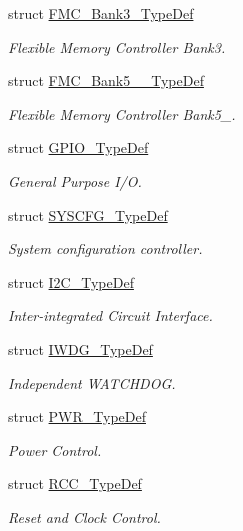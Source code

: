 \begin{DoxyCompactItemize}
struct \mbox{\hyperlink{struct_f_m_c___bank3___type_def}{F\+M\+C\+\_\+\+Bank3\+\_\+\+Type\+Def}}
\begin{DoxyCompactList}\small\item\em Flexible Memory Controller Bank3. \end{DoxyCompactList}\item 
struct \mbox{\hyperlink{struct_f_m_c___bank5__6___type_def}{F\+M\+C\+\_\+\+Bank5\+\_\+\_\+\+Type\+Def}}
\begin{DoxyCompactList}\small\item\em Flexible Memory Controller Bank5\+\_. \end{DoxyCompactList}\item 
struct \mbox{\hyperlink{struct_g_p_i_o___type_def}{G\+P\+I\+O\+\_\+\+Type\+Def}}
\begin{DoxyCompactList}\small\item\em General Purpose I/O. \end{DoxyCompactList}\item 
struct \mbox{\hyperlink{struct_s_y_s_c_f_g___type_def}{S\+Y\+S\+C\+F\+G\+\_\+\+Type\+Def}}
\begin{DoxyCompactList}\small\item\em System configuration controller. \end{DoxyCompactList}\item 
struct \mbox{\hyperlink{struct_i2_c___type_def}{I2\+C\+\_\+\+Type\+Def}}
\begin{DoxyCompactList}\small\item\em Inter-\/integrated Circuit Interface. \end{DoxyCompactList}\item 
struct \mbox{\hyperlink{struct_i_w_d_g___type_def}{I\+W\+D\+G\+\_\+\+Type\+Def}}
\begin{DoxyCompactList}\small\item\em Independent W\+A\+T\+C\+H\+D\+OG. \end{DoxyCompactList}\item 
struct \mbox{\hyperlink{struct_p_w_r___type_def}{P\+W\+R\+\_\+\+Type\+Def}}
\begin{DoxyCompactList}\small\item\em Power Control. \end{DoxyCompactList}\item 
struct \mbox{\hyperlink{struct_r_c_c___type_def}{R\+C\+C\+\_\+\+Type\+Def}}
\begin{DoxyCompactList}\small\item\em Reset and Clock Control. \end{DoxyCompactList}\item 

\end{DoxyCompactItemize}
